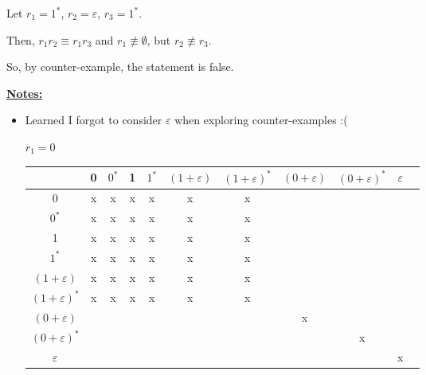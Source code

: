 \documentclass[12pt]{article}
\begin{document}
\begin{enumerate}[a.]
    \bigskip

    Let $r_1 = 1^*$, $r_2 = \varepsilon$, $r_3 = 1^*$.

    \bigskip

    Then, $r_1r_2 \equiv r_1r_3$ and $r_1 \not\equiv \emptyset$, but $r_2 \not\equiv r_3$.

    \bigskip

    So, by counter-example, the statement is false.

    \bigskip

    \underline{\textbf{Notes:}}

    \bigskip

    \begin{itemize}
        \item Learned I forgot to consider $\varepsilon$ when exploring counter-examples :(

        \bigskip

        $r_1 = 0$

        \begin{tabular}{|c|c|c|c|c|c|c|c|c|c|c|}
            \hline
                                & 0 & $0^*$ & 1 & $1^*$ & $(1+\varepsilon)$ & $(1+\varepsilon)^*$ & $(0+\varepsilon)$ & $(0+\varepsilon)^*$ & $\varepsilon$\\
            \hline
            0                   & x & x & x & x & x & x & & & \\
            \hline
            $0^*$               & x & x & x & x & x & x & & & \\
            \hline
            1                   & x & x & x & x & x & x & & & \\
            \hline
            $1^*$               & x & x & x & x & x & x & & & \\
            \hline
            $(1+\varepsilon)$   & x & x & x & x & x & x & & & \\
            \hline
            $(1+\varepsilon)^*$ & x & x & x & x & x & x & & & \\
            \hline
            $(0+\varepsilon)$   & & & & & & & x & & \\
            \hline
            $(0+\varepsilon)^*$ & & & & & & & & x & \\
            \hline
            $\varepsilon$       & & & & & & & & & x \\
            \hline
        \end{tabular}
    \end{itemize}

    \end{enumerate}
\end{document}
